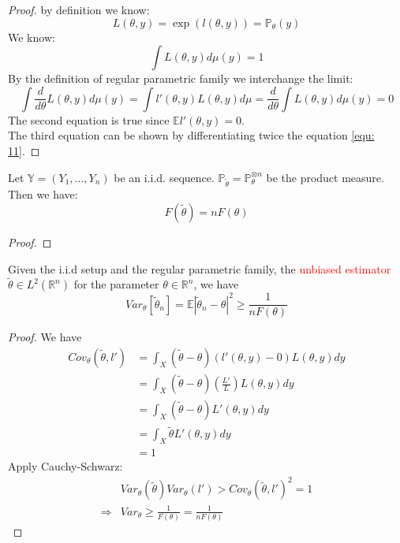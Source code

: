 \begin{proof}
	by definition we know:
	\begin{equation} \label{equ: 11}
		L(\theta, y) = \exp (l(\theta, y)) = \mathbb{P}_\theta(y)
	\end{equation}
	We know:
	\begin{equation*}
		\int L(\theta, y) d\mu(y) = 1
	\end{equation*}
	By the definition of regular parametric family we interchange the limit:
	\begin{equation*}
		\int \frac{d}{d\theta} L(\theta, y) d\mu(y) = \int l'(\theta, y) L(\theta, y)d\mu = \frac{d}{d\theta} \int L(\theta, y) d\mu(y) = 0
	\end{equation*}
	The second equation is true since $\mathbb{E}l'(\theta, y) = 0$.\\
	The third equation can be shown by differentiating twice the equation \ref{equ: 11}.
\end{proof}

\begin{lemma}
Let $\mathbb{Y} = (Y_1, \dots, Y_n)$ be an i.i.d. sequence. $\mathbb{P}_{\tilde{\theta}} = \mathbb{P}_\theta^{\otimes n}$ be the product measure.	 Then we have:
\begin{equation}
	F(\tilde{\theta}) = nF(\theta)
\end{equation}
\end{lemma}

\begin{proof}
	
\end{proof}

\begin{theorem}
	Given the i.i.d setup and the regular parametric family, the \textcolor{red} {unbiased estimator} $\tilde{\theta}\in L^2(\mathbb{R}^n) $ for the parameter $\theta \in \mathbb{R}^n $, we have
	\begin{equation*}
		Var_\theta[\tilde{\theta}_n] =  \mathbb{E} |\tilde{\theta}_n - \theta|^2 \geq \frac{1}{n F(\theta)}
	\end{equation*}
\end{theorem}
\begin{proof}
We have
\begin{align*}
	Cov_\theta(\tilde{\theta}, l') &= \int_X (\tilde{\theta} - \theta)(l'(\theta, y) - 0)L(\theta, y) dy \\
	&= \int_X (\tilde{\theta} - \theta)(\frac{L'}{L})L(\theta, y)dy\\
	&= \int_X (\tilde{\theta} - \theta) L'(\theta, y) dy\\
	&= \int_X \tilde{\theta} L'(\theta, y) dy\\
	&= 1
\end{align*}
Apply Cauchy-Schwarz:
\begin{align*}
	&Var_\theta (\tilde{\theta}) Var_\theta(l') > Cov_\theta(\tilde{\theta}, l')^2 = 1\\
	\Rightarrow &Var_\theta \geq \frac{1}{F(\theta)} = \frac{1}{nF(\theta)}
\end{align*}
\end{proof}

